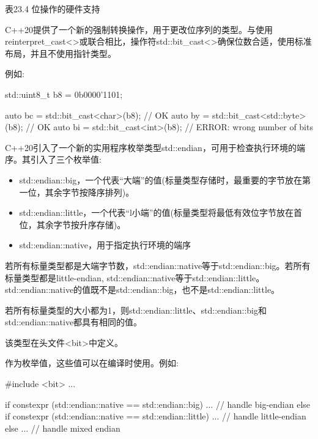 \begin{center}
表23.4 位操作的硬件支持
\end{center}


C++20提供了一个新的强制转换操作，用于更改位序列的类型。与使用reinterpret\_cast<>或联合相比，操作符std::bit\_cast<>确保位数合适，使用标准布局，并且不使用指针类型。

例如:

\begin{cpp}
std::uint8_t b8 = 0b0000'1101;

auto bc = std::bit_cast<char>(b8); // OK
auto by = std::bit_cast<std::byte>(b8); // OK
auto bi = std::bit_cast<int>(b8); // ERROR: wrong number of bits
\end{cpp}


C++20引入了一个新的实用程序枚举类型std::endian，可用于检查执行环境的端序。其引入了三个枚举值:

\begin{itemize}
\item
std::endian::big，一个代表“大端”的值(标量类型存储时，最重要的字节放在第一位，其余字节按降序排列)。

\item
std::endian::little，一个代表“l小端”的值(标量类型将最低有效位字节放在首位，其余字节按升序存储)。

\item
std::endian::native，用于指定执行环境的端序
\end{itemize}

若所有标量类型都是大端字节数，std::endian::native等于std::endian::big。若所有标量类型都是little-endian, std::endian::native等于std::endian::little。std::endian::native的值既不是std::endian::big，也不是std::endian::little。

若所有标量类型的大小都为1，则std::endian::little、std::endian::big和std::endian::native都具有相同的值。

该类型在头文件<bit>中定义。

作为枚举值，这些值可以在编译时使用。例如:

\begin{cpp}
#include <bit>
...

if constexpr (std::endian::native == std::endian::big) {
	... // handle big-endian
}
else if constexpr (std::endian::native == std::endian::little) {
	... // handle little-endian
}
else {
	... // handle mixed endian
}
\end{cpp}










